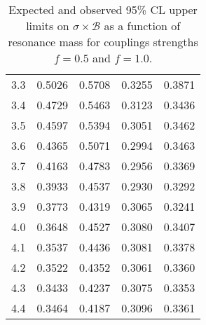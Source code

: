 \begin{table}[h!]
\begin{center}
\begin{tabular}{c||cc||cc}
3.3 & 0.5026  &  0.5708 & 0.3255 &  0.3871 \\
3.4 & 0.4729  &  0.5463 & 0.3123 &  0.3436 \\
3.5 & 0.4597  &  0.5394 & 0.3051 &  0.3462 \\
3.6 & 0.4365  &  0.5071 & 0.2994 &  0.3463 \\
3.7 & 0.4163  &  0.4783 & 0.2956 &  0.3369 \\
3.8 & 0.3933  &  0.4537 & 0.2930 &  0.3292 \\
3.9 & 0.3773  &  0.4319 & 0.3065 &  0.3241 \\
4.0 & 0.3648  &  0.4527 & 0.3080 &  0.3407 \\
4.1 & 0.3537  &  0.4436 & 0.3081 &  0.3378 \\
4.2 & 0.3522  &  0.4352 & 0.3061 &  0.3360 \\
4.3 & 0.3433  &  0.4237 & 0.3075 &  0.3353 \\
4.4 & 0.3464  &  0.4187 & 0.3096 &  0.3361 \\
\hline
\end{tabular}
\caption{Expected and observed 95\% CL upper limits on $\sigma\times\mathcal{B}$ as a function of resonance mass for couplings strengths $f=0.5$ and $f=1.0$.}
   \label{Table:ObsLimits}
\end{center}
\end{table}

